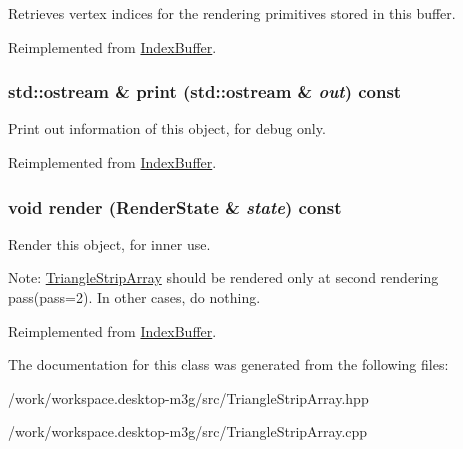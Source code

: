 Retrieves vertex indices for the rendering primitives stored in this buffer. 

Reimplemented from \hyperlink{classm3g_1_1IndexBuffer_650953afac45099025a524ab160b911f}{IndexBuffer}.\hypertarget{classm3g_1_1TriangleStripArray_6fea17fa1532df3794f8cb39cb4f911f}{
\subsubsection[{print}]{\setlength{\rightskip}{0pt plus 5cm}std::ostream \& print (std::ostream \& {\em out}) const}}
\label{classm3g_1_1TriangleStripArray_6fea17fa1532df3794f8cb39cb4f911f}


Print out information of this object, for debug only. 

Reimplemented from \hyperlink{classm3g_1_1IndexBuffer_6fea17fa1532df3794f8cb39cb4f911f}{IndexBuffer}.\hypertarget{classm3g_1_1TriangleStripArray_8babc8a79b78615da51161e94029eea9}{
\subsubsection[{render}]{\setlength{\rightskip}{0pt plus 5cm}void render ({\bf RenderState} \& {\em state}) const}}
\label{classm3g_1_1TriangleStripArray_8babc8a79b78615da51161e94029eea9}


Render this object, for inner use.

Note: \hyperlink{classm3g_1_1TriangleStripArray}{TriangleStripArray} should be rendered only at second rendering pass(pass=2). In other cases, do nothing. 

Reimplemented from \hyperlink{classm3g_1_1IndexBuffer_8babc8a79b78615da51161e94029eea9}{IndexBuffer}.

The documentation for this class was generated from the following files:\begin{CompactItemize}
\item 
/work/workspace.desktop-m3g/src/TriangleStripArray.hpp\item 
/work/workspace.desktop-m3g/src/TriangleStripArray.cpp\end{CompactItemize}

